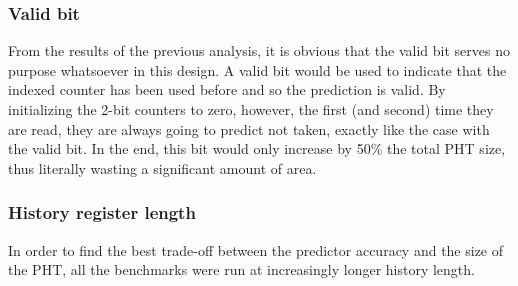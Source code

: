 \subsubsection{Valid bit}
From the results of the previous analysis, it is obvious that the valid bit serves no purpose whatsoever in this design. A valid bit would be used to indicate that the indexed counter has been used before and so the prediction is valid. By initializing the 2-bit counters to zero, however, the first (and second) time they are read, they are always going to predict not taken, exactly like the case with the valid bit. In the end, this bit would only increase by 50\% the total \ac{PHT} size, thus literally wasting a significant amount of area.

\subsubsection{History register length}
In order to find the best trade-off between the predictor accuracy and the size of the \ac{PHT}, all the benchmarks were run at increasingly longer history length.
